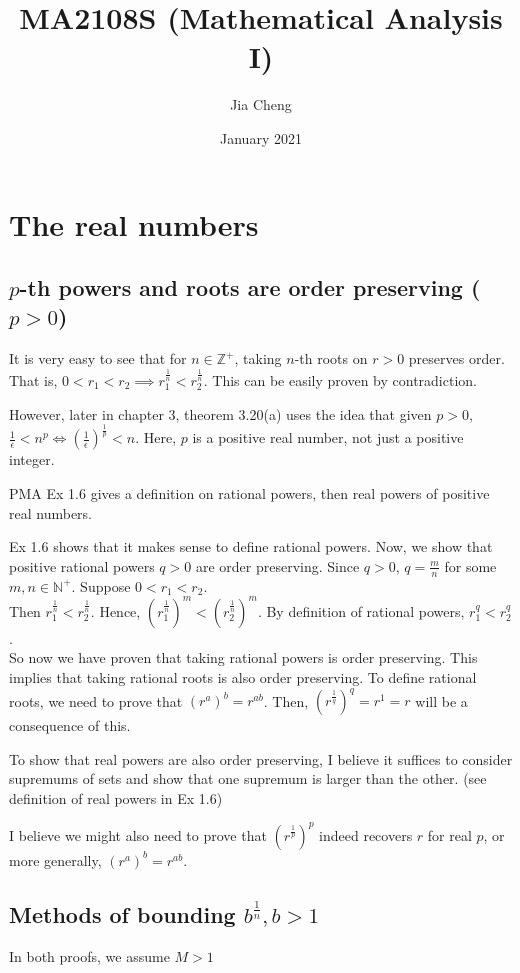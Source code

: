 \documentclass{article}
\title{MA2108S (Mathematical Analysis I)}
\author{Jia Cheng}
\date{January 2021}
\begin{document}
\maketitle

\section{The real numbers}
\subsection{$p$-th powers and roots are order preserving ($p > 0$)}
It is very easy to see that for $n\in \mathbb{Z}^+$, taking $n$-th roots on $r>0$ preserves order. That is, $0 < r_1 < r_2 \implies r_1^{\frac{1}{n}} < r_2^\frac{1}{n}$. This can be easily proven by contradiction.

However, later in chapter 3, theorem 3.20(a) uses the idea that given $p>0$, $\frac{1}{\epsilon} < n^p \iff (\frac{1}{\epsilon})^\frac{1}{p} < n$. Here, $p$ is a positive real number, not just a positive integer.


PMA Ex 1.6 gives a definition on rational powers, then real powers of positive real numbers.

Ex 1.6 shows that it makes sense to define rational powers. Now, we show that positive rational powers $q > 0$ are order preserving. Since $q>0$, $q=\frac{m}{n}$ for some $m,n\in \mathbb{N}^+$. Suppose $0<r_1<r_2$.\\
Then $r_1^\frac{1}{n} < r_2^\frac{1}{n}$. Hence, $(r_1^\frac{1}{n})^m < (r_2^\frac{1}{n})^m$. By definition of rational powers, $r_1^q < r_2^q$.\\
So now we have proven that taking rational powers is order preserving. This implies that taking rational roots is also order preserving. To define rational roots, we need to prove that $(r^a)^b=r^{ab}$. Then, $(r^\frac{1}{q})^q=r^1=r$ will be a consequence of this.

To show that real powers are also order preserving, I believe it suffices to consider supremums of sets and show that one supremum is larger than the other. (see definition of real powers in Ex 1.6)

I believe we might also need to prove that $(r^\frac{1}{p})^p$ indeed recovers $r$ for real $p$, or more generally, $(r^a)^b=r^{ab}$.

\subsection{Methods of bounding $b^\frac{1}{n}, b>1$}
In both proofs, we assume $M > 1$
\end{document}
